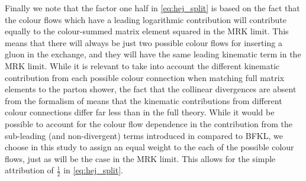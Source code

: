 Finally we note that the factor one half in \cref{eq:hej_split} is based on
the fact that the colour flows which have a leading logarithmic
contribution will contribute equally to the colour-summed matrix element
squared in the MRK limit. This means that there will always be just two
possible colour flows for inserting a gluon in the exchange, and they will
have the same leading kinematic term in the MRK limit. While it is relevant
to take into account the different kinematic contribution from each possible
colour connection when matching full matrix elements to the parton shower,
the fact that the collinear divergences are absent from the formalism of \HEJ
means that the kinematic contributions from different colour connections
differ far less than in the full theory. While it would be possible to
account for the colour flow dependence in the contribution from the
sub-leading (and non-divergent) terms introduced in \HEJ compared to BFKL, we
choose in this study to assign an equal weight to the each of the possible
colour flows, just as will be the case in the MRK limit. This allows for the
simple attribution of $\frac 1 2 $ in \cref{eq:hej_split}.



